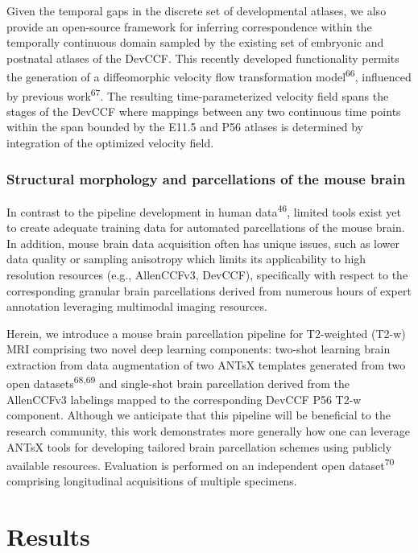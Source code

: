 \documentclass[
  12pt,
]{article}
\begin{document}
Given the temporal gaps in the discrete set of developmental atlases, we
also provide an open-source framework for inferring correspondence
within the temporally continuous domain sampled by the existing set of
embryonic and postnatal atlases of the DevCCF. This recently developed
functionality permits the generation of a diffeomorphic velocity flow
transformation model\textsuperscript{66}, influenced by previous
work\textsuperscript{67}. The resulting time-parameterized velocity
field spans the stages of the DevCCF where mappings between any two
continuous time points within the span bounded by the E11.5 and P56
atlases is determined by integration of the optimized velocity field.

\subsubsection{Structural morphology and parcellations of the mouse
brain}\label{structural-morphology-and-parcellations-of-the-mouse-brain}

In contrast to the pipeline development in human
data\textsuperscript{46}, limited tools exist yet to create adequate
training data for automated parcellations of the mouse brain. In
addition, mouse brain data acquisition often has unique issues, such as
lower data quality or sampling anisotropy which limits its applicability
to high resolution resources (e.g., AllenCCFv3, DevCCF), specifically
with respect to the corresponding granular brain parcellations derived
from numerous hours of expert annotation leveraging multimodal imaging
resources.

Herein, we introduce a mouse brain parcellation pipeline for T2-weighted
(T2-w) MRI comprising two novel deep learning components: two-shot
learning brain extraction from data augmentation of two ANTsX templates
generated from two open datasets\textsuperscript{68,69} and single-shot
brain parcellation derived from the AllenCCFv3 labelings mapped to the
corresponding DevCCF P56 T2-w component. Although we anticipate that
this pipeline will be beneficial to the research community, this work
demonstrates more generally how one can leverage ANTsX tools for
developing tailored brain parcellation schemes using publicly available
resources. Evaluation is performed on an independent open
dataset\textsuperscript{70} comprising longitudinal acquisitions of
multiple specimens.

\clearpage
\newpage

\section{Results}\label{results}
\end{document}
